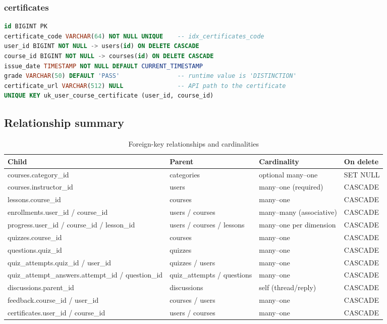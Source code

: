 \subsubsection{certificates}
\begin{lstlisting}[language=sql]
id BIGINT PK
certificate_code VARCHAR(64) NOT NULL UNIQUE    -- idx_certificates_code
user_id BIGINT NOT NULL -> users(id) ON DELETE CASCADE
course_id BIGINT NOT NULL -> courses(id) ON DELETE CASCADE
issue_date TIMESTAMP NOT NULL DEFAULT CURRENT_TIMESTAMP
grade VARCHAR(50) DEFAULT 'PASS'                -- runtime value is 'DISTINCTION'
certificate_url VARCHAR(512) NULL               -- API path to the certificate
UNIQUE KEY uk_user_course_certificate (user_id, course_id)
\end{lstlisting}

\subsection{Relationship summary}

\begin{table}[H]
\centering
\caption{Foreign-key relationships and cardinalities}
\label{tab:relationships}
\begin{tabular}{@{}L{3.6cm}L{3.6cm}C{2.4cm}L{4.0cm}@{}}
\toprule
\textbf{Child} & \textbf{Parent} & \textbf{Cardinality} & \textbf{On delete} \\
\midrule
courses.category\_id & categories & optional many--one & SET NULL \\
courses.instructor\_id & users & many--one (required) & CASCADE \\
lessons.course\_id & courses & many--one & CASCADE \\
enrollments.user\_id / course\_id & users / courses & many--many (associative) & CASCADE \\
progress.user\_id / course\_id / lesson\_id & users / courses / lessons & many--one per dimension & CASCADE \\
quizzes.course\_id & courses & many--one & CASCADE \\
questions.quiz\_id & quizzes & many--one & CASCADE \\
quiz\_attempts.quiz\_id / user\_id & quizzes / users & many--one & CASCADE \\
quiz\_attempt\_answers.attempt\_id / question\_id & quiz\_attempts / questions & many--one & CASCADE \\
discussions.parent\_id & discussions & self (thread/reply) & CASCADE \\
feedback.course\_id / user\_id & courses / users & many--one & CASCADE \\
certificates.user\_id / course\_id & users / courses & many--one & CASCADE \\
\bottomrule
\end{tabular}
\end{table}

